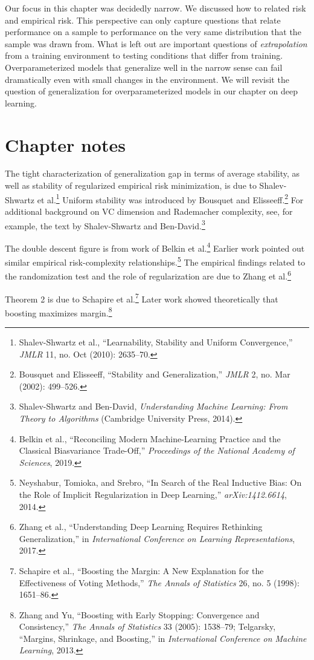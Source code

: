 \documentclass{tufte-book}
\begin{document}
Our focus in this chapter was decidedly narrow. We discussed how to
related risk and empirical risk. This perspective can only capture
questions that relate performance on a sample to performance on the very
same distribution that the sample was drawn from. What is left out are
important questions of \emph{extrapolation} from a training environment
to testing conditions that differ from training. Overparameterized
models that generalize well in the narrow sense can fail dramatically
even with small changes in the environment. We will revisit the question
of generalization for overparameterized models in our chapter on deep
learning.

\hypertarget{chapter-notes-5}{%
\section{Chapter notes}\label{chapter-notes-5}}

The tight characterization of generalization gap in terms of average
stability, as well as stability of regularized empirical risk
minimization, is due to Shalev-Shwartz et al.\footnote{Shalev-Shwartz et
  al., {``Learnability, Stability and Uniform Convergence,''}
  \emph{JMLR} 11, no. Oct (2010): 2635--70.} Uniform stability was
introduced by Bousquet and Elisseeff.\footnote{Bousquet and Elisseeff,
  {``Stability and Generalization,''} \emph{JMLR} 2, no. Mar (2002):
  499--526.} For additional background on VC dimension and Rademacher
complexity, see, for example, the text by Shalev-Shwartz and
Ben-David.\footnote{Shalev-Shwartz and Ben-David, \emph{Understanding
  Machine Learning: From Theory to Algorithms} (Cambridge University
  Press, 2014).}

The double descent figure is from work of Belkin et al.\footnote{Belkin
  et al., {``Reconciling Modern Machine-Learning Practice and the
  Classical Bias{{}}variance Trade-Off,''} \emph{Proceedings of the
  National Academy of Sciences}, 2019.} Earlier work pointed out similar
empirical risk-complexity relationships.\footnote{Neyshabur, Tomioka,
  and Srebro, {``In Search of the Real Inductive Bias: On the Role of
  Implicit Regularization in Deep Learning,''} \emph{arXiv:1412.6614},
  2014.} The empirical findings related to the randomization test and
the role of regularization are due to Zhang et al.\footnote{Zhang et
  al., {``Understanding Deep Learning Requires Rethinking
  Generalization,''} in \emph{International Conference on Learning
  Representations}, 2017.}

Theorem 2 is due to Schapire et al.\footnote{Schapire et al.,
  {``Boosting the Margin: A New Explanation for the Effectiveness of
  Voting Methods,''} \emph{The Annals of Statistics} 26, no. 5 (1998):
  1651--86.} Later work showed theoretically that boosting maximizes
margin.\footnote{Zhang and Yu, {``Boosting with Early Stopping:
  Convergence and Consistency,''} \emph{The Annals of Statistics} 33
  (2005): 1538--79; Telgarsky, {``Margins, Shrinkage, and Boosting,''}
  in \emph{International Conference on Machine Learning}, 2013.}
\end{document}
